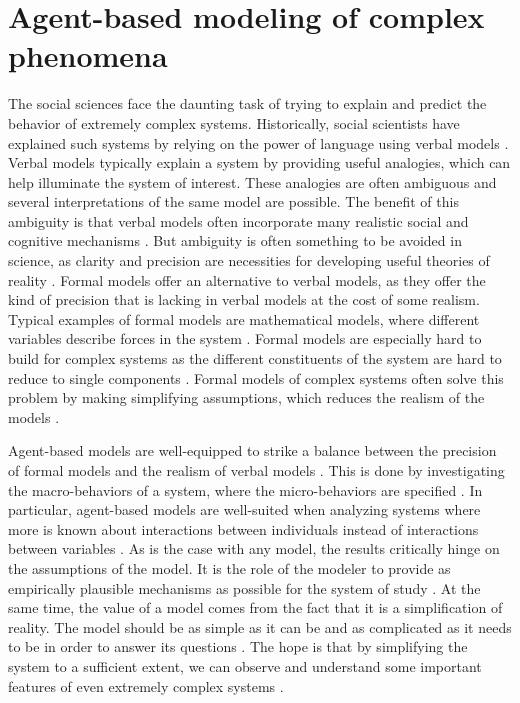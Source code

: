 \documentclass[11pt]{article}
\begin{document}
\section{Agent-based modeling of complex phenomena}
The social sciences face the daunting task of trying to explain and predict the behavior of extremely complex systems. 
Historically, social scientists have explained such systems by relying on the power of language using verbal models \cite{smaldino_how_2020}. Verbal models typically explain a system by providing useful analogies, which can help illuminate the system of interest. These analogies are often ambiguous and several interpretations of the same model are possible. The benefit of this ambiguity is that verbal models often incorporate many realistic social and cognitive mechanisms \cite{fogarty_ten_2022}. But ambiguity is often something to be avoided in science, as clarity and precision are necessities for developing useful theories of reality \cite{smaldino_how_2020}. 
Formal models offer an alternative to verbal models, as they offer the kind of precision that is lacking in verbal models at the cost of some realism. Typical examples of formal models are mathematical models, where different variables describe forces in the system \cite{fogarty_ten_2022}. Formal models are especially hard to build for complex systems as the different constituents of the system are hard to reduce to single components \cite{smaldino_how_2020, poli2013note}. Formal models of complex systems often solve this problem by making simplifying assumptions, which reduces the realism of the models \cite{fogarty_ten_2022}. 

Agent-based models are well-equipped to strike a balance between the precision of formal models and the realism of verbal models \cite{flache_between_2018,galesic_integrating_2021,epstein1999agent,mas2014cultural}. This is done by investigating the macro-behaviors of a system, where the micro-behaviors are specified \cite{bruch_agent-based_2015,epstein1999agent,flache_between_2018}. In particular, agent-based models are well-suited when analyzing systems where more is known about interactions between individuals instead of interactions between variables \cite{geschke2019triple}. As is the case with any model, the results critically hinge on the assumptions of the model. It is the role of the modeler to provide as empirically plausible mechanisms as possible for the system of study \cite{crooks2012introduction,epstein1999agent,page2010diversity}. At the same time, the value of a model comes from the fact that it is a simplification of reality. The model should be as simple as it can be and as complicated as it needs to be in order to answer its questions \cite{smaldino_how_2020}. The hope is that by simplifying the system to a sufficient extent, we can observe and understand some important features of even extremely complex systems \cite{fogarty_ten_2022,smaldino_models_2016, smaldino_how_2020, smaldino_models_2022}.
\end{document}

